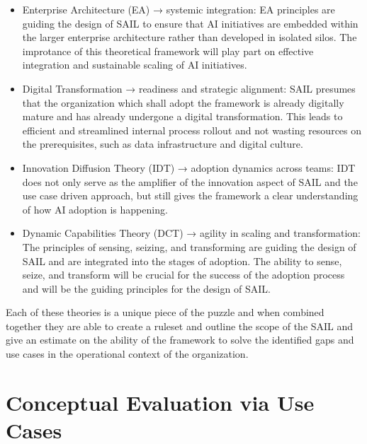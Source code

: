 \documentclass[]{imc-inf}
\def\tightlist{}
\begin{document}
\begin{itemize}
	\tightlist
	\item
	Enterprise Architecture (EA) → systemic integration: EA principles are
	guiding the design of SAIL to ensure that AI initiatives are embedded
	within the larger enterprise architecture rather than developed in
	isolated silos. The improtance of this theoretical framework will play
	part on effective integration and sustainable scaling of AI
	initiatives.
	\item
	Digital Transformation → readiness and strategic alignment: SAIL
	presumes that the organization which shall adopt the framework is
	already digitally mature and has already undergone a digital
	transformation. This leads to efficient and streamlined internal
	process rollout and not wasting resources on the prerequisites, such
	as data infrastructure and digital culture.
	\item
	Innovation Diffusion Theory (IDT) → adoption dynamics across teams:
	IDT does not only serve as the amplifier of the innovation aspect of
	SAIL and the use case driven approach, but still gives the framework a
	clear understanding of how AI adoption is happening.
	\item
	Dynamic Capabilities Theory (DCT) → agility in scaling and
	transformation: The principles of sensing, seizing, and transforming
	are guiding the design of SAIL and are integrated into the stages of
	adoption. The ability to sense, seize, and transform will be crucial
	for the success of the adoption process and will be the guiding
	principles for the design of SAIL.
\end{itemize}

Each of these theories is a unique piece of the puzzle and when combined
together they are able to create a ruleset and outline the scope of the
SAIL and give an estimate on the ability of the framework to solve the
identified gaps and use cases in the operational context of the
organization.

\section{Conceptual Evaluation via Use
	Cases}\label{conceptual-evaluation-via-use-cases}
\end{document}
